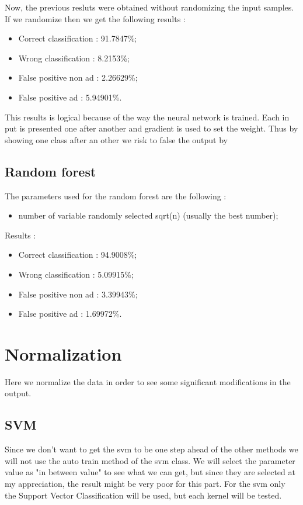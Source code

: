   Now, the previous resluts were obtained without randomizing the input samples. If we randomize then we get the following results :
  \begin{itemize}
    \item Correct classification : 91.7847\%;
    \item Wrong classification : 8.2153\%;
    \item False positive non ad : 2.26629\%;
    \item False positive ad : 5.94901\%.
  \end{itemize}

  This results is logical because of the way the neural network is trained. Each in put is presented one after another and gradient is used to set the weight. Thus by showing one class after an other we risk to false the output by
\section{Random forest}
The parameters used for the random forest are the following :
  \begin{itemize}
    \item number of variable randomly selected sqrt(n) (usually the best number);
  \end{itemize}
Results :
\begin{itemize}
  \item Correct classification : 94.9008\%;
  \item Wrong classification : 5.09915\%;
  \item False positive non ad : 3.39943\%;
  \item False positive ad : 1.69972\%.
\end{itemize}

\chapter{Normalization}

Here we normalize the data in order to see some significant modifications in the output.

\section{SVM}

Since we don't want to get the svm to be one step ahead of the other methods we will not use the auto train method of the svm class. We will select the parameter value as "in between value" to see what we can get, but since they are selected at my appreciation, the result might be very poor for this part.
For the svm only the Support Vector Classification will be used, but each kernel will be tested.


